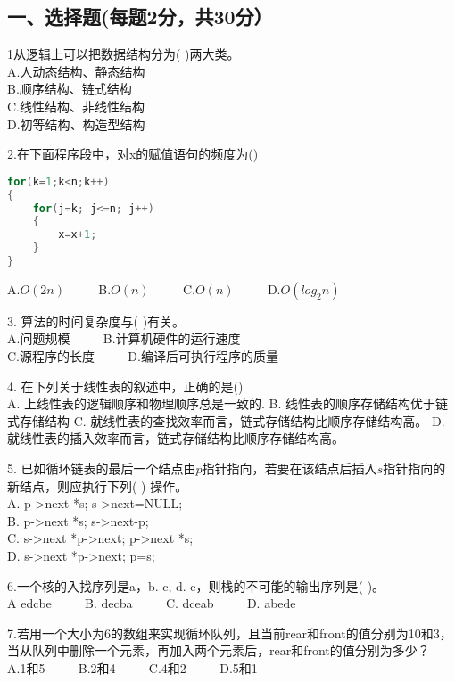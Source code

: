 

\subsection{一、选择题(每题2分，共30分）}
1从逻辑上可以把数据结构分为( )两大类。 \\
A.人动态结构、静态结构 \\
B.顺序结构、链式结构 \\
C.线性结构、非线性结构 \\
D.初等结构、构造型结构

2.在下面程序段中，对x的赋值语句的频度为() \\
\begin{lstlisting}[language=cpp]
for(k=1;k<n;k++)
{
    for(j=k; j<=n; j++)
    {
        x=x+1;
    }
}
\end{lstlisting}
A.$O(2n)$ $\qquad$ B.$O(n)$ $\qquad$ C.$O(n)$ $\qquad$ D.$O(log_2n)$

3. 算法的时间复杂度与(    )有关。 \\
A.问题规模 $\qquad$  B.计算机硬件的运行速度 \\
C.源程序的长度 $\qquad$ D.编译后可执行程序的质量

4. 在下列关于线性表的叙述中，正确的是() \\
A. 上线性表的逻辑顺序和物理顺序总是一致的.
B. 线性表的顺序存储结构优于链式存储结构
C. 就线性表的查找效率而言，链式存储结构比顺序存储结构高。
D. 就线性表的插入效率而言，链式存储结构比顺序存储结构高。

5. 已如循环链表的最后一个结点由$p$指针指向，若要在该结点后插入$s$指针指向的新结点，则应执行下列( ) 操作。 \\
A. p->next *s; s->next=NULL; \\
B. p->next *s; s->next-p;  \\
C. s->next *p->next; p->next *s;  \\
D. s->next *p->next; p=s;

6.一个核的入找序列是a，b. c, d. e，则栈的不可能的输出序列是(  )。 \\
A edcbe  $\qquad$  B. decba  $\qquad$  C. dceab  $\qquad$ D. abede

7.若用一个大小为6的数组来实现循环队列，且当前rear和front的值分别为10和3，当从队列中删除一个元素，再加入两个元素后，rear和front的值分别为多少？  \\
A.1和5  $\qquad$  B.2和4  $\qquad$  C.4和2  $\qquad$  D.5和1


